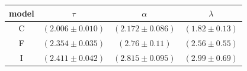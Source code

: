 \begin{tabular}{cccc}
\toprule
model & $\tau$ & $\alpha$ & $\lambda$ \\
\midrule
C & $ (2.006\pm0.010) $ & $ (2.172\pm0.086) $ & $ (1.82\pm0.13) $ \\
F & $ (2.354\pm0.035) $ & $ (2.76\pm0.11) $ & $ (2.56\pm0.55) $ \\
I & $ (2.411\pm0.042) $ & $ (2.815\pm0.095) $ & $ (2.99\pm0.69) $ \\
\bottomrule
\end{tabular}
